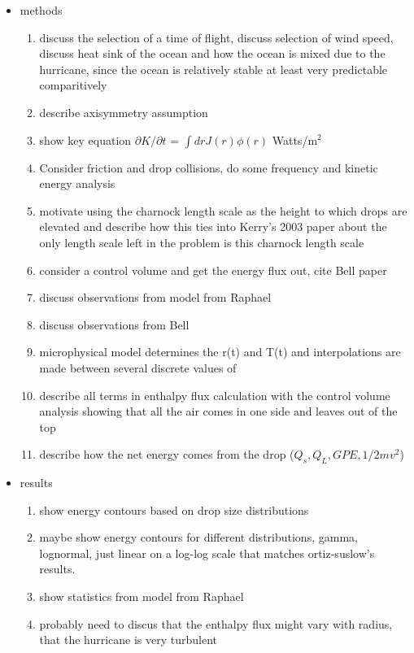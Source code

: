 \documentclass[10pt,a4paper]{article}
\begin{document}
\begin{itemize}
\begin{enumerate}
\end{enumerate}
\item
methods
\begin{enumerate}
\item discuss the selection of a time of flight, discuss selection of wind speed, discuss heat sink of the ocean and how the ocean is mixed due to the hurricane, since the ocean is relatively stable at least very predictable comparitively
\item
describe axisymmetry assumption 
\item
show key equation $\partial K/\partial t$ = $\int dr J(r)\phi(r)$ Watts/m$^2$
\item
Consider friction and drop collisions, do some frequency and kinetic energy analysis
\item
motivate using the charnock length scale as the height to which drops are elevated and describe how this ties into Kerry's 2003 paper about the only length scale left in the problem is this charnock length scale
\item
consider a control volume and get the energy flux out, cite Bell paper
\item
discuss observations from model from Raphael
\item
discuss observations from Bell
\item
microphysical model determines the r(t) and T(t) and interpolations are made between several discrete values of
\item
describe all terms in enthalpy flux calculation with the control volume analysis showing that all the air comes in one side and leaves out of the top
\item
describe how the net energy comes from the drop ($Q_s, Q_L, GPE,1/2mv^2$)
\end{enumerate}
\item
results
\begin{enumerate}
\item
show energy contours based on drop size distributions
\item
maybe show energy contours for different distributions, gamma, lognormal, just linear on a log-log scale that matches ortiz-suslow's results.
\item
show statistics from model from Raphael
\item
probably need to discus that the enthalpy flux might vary with radius, that the hurricane is very turbulent
\end{enumerate}

\end{itemize}
\end{document}
